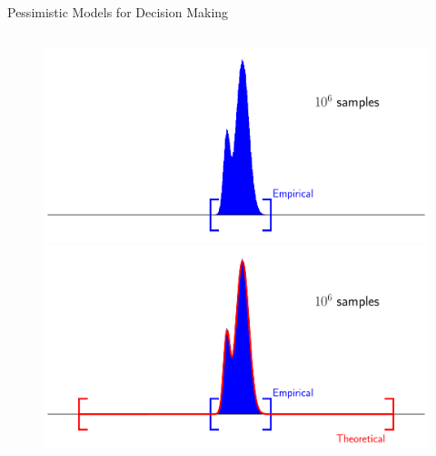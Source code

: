 \documentclass[lecture]{beamer}
\begin{document}
\begin{frame}{\normalsize Pessimistic Models for Decision Making}
\begin{columns}[t]
  \begin{overlayarea}{\textwidth}{0.4\textheight}
    \begin{figure}
     \newcommand{\FS}{1}
        {
        \center
	\includegraphics[width=1\textwidth,clip]{Codes/BasicsSafety/Support0.pdf}
	}
	      \only<14>
        {
        \center
	\includegraphics[width=1\textwidth,clip]{Codes/BasicsSafety/Support1.pdf}
	}
	\end{figure}
  \end{overlayarea} 

\end{columns}

\end{frame}
\end{document}
